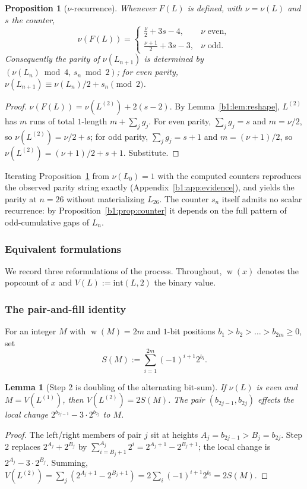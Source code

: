 \documentclass[a4paper]{article}
\theoremstyle{plain}
\newtheorem{proposition}{Proposition}[subsection]
\newtheorem{lemma}{Lemma}[subsection]
\theoremstyle{definition}
\theoremstyle{remark}
\DeclareMathOperator{\popcount}{w}
\begin{document}
\begin{proposition}[$\nu$-recurrence]\label{b1:prop:nu}
Whenever $F(L)$ is defined, with $\nu=\nu(L)$ and $s$ the counter,
\[ \nu(F(L))=\begin{cases}\tfrac{\nu}{2}+3s-4,& \nu\text{ even},\\ \tfrac{\nu+1}{2}+3s-3,& \nu\text{ odd}.\end{cases} \]
Consequently the parity of $\nu(L_{n+1})$ is determined by $(\nu(L_n)\bmod 4,\,s_n\bmod 2)$; for even parity, $\nu(L_{n+1})\equiv\nu(L_n)/2+s_n\pmod 2$.
\end{proposition}
\begin{proof}
$\nu(F(L))=\nu(L^{(2)})+2(s-2)$. By Lemma~\ref{b1:lem:reshape}, $L^{(2)}$ has $m$ runs of total $1$-length $m+\sum_j g_j$. For even parity, $\sum_j g_j=s$ and $m=\nu/2$, so $\nu(L^{(2)})=\nu/2+s$; for odd parity, $\sum_j g_j=s+1$ and $m=(\nu+1)/2$, so $\nu(L^{(2)})=(\nu+1)/2+s+1$. Substitute.
\end{proof}

Iterating Proposition~\ref{b1:prop:nu} from $\nu(L_0)=1$ with the computed counters reproduces the observed parity string exactly (Appendix~\ref{b1:app:evidence}), and yields the parity at $n=26$ without materializing $L_{26}$. The counter $s_n$ itself admits no scalar recurrence: by Proposition~\ref{b1:prop:counter} it depends on the full pattern of odd-cumulative gaps of $L_n$.

\subsubsection{Equivalent formulations}\label{b1:sec:equiv}
We record three reformulations of the process. Throughout, $\popcount(x)$ denotes the popcount of $x$ and $V(L):=\mathrm{int}(L,2)$ the binary value.

\subsubsection{The pair-and-fill identity}\label{b1:sec:10.1}
For an integer $M$ with $\popcount(M)=2m$ and $1$-bit positions $b_1>b_2>\dots>b_{2m}\ge 0$, set
\[ S(M):=\sum_{i=1}^{2m}(-1)^{i+1}2^{b_i}. \]

\begin{lemma}[Step 2 is doubling of the alternating bit-sum]\label{b1:lem:S}
If $\nu(L)$ is even and $M=V(L^{(1)})$, then $V(L^{(2)})=2S(M)$. The pair $(b_{2j-1},b_{2j})$ effects the local change $2^{b_{2j-1}}-3\cdot 2^{b_{2j}}$ to $M$.
\end{lemma}
\begin{proof}
The left/right members of pair $j$ sit at heights $A_j=b_{2j-1}>B_j=b_{2j}$. Step 2 replaces $2^{A_j}+2^{B_j}$ by $\sum_{i=B_j+1}^{A_j}2^i=2^{A_j+1}-2^{B_j+1}$; the local change is $2^{A_j}-3\cdot 2^{B_j}$. Summing, $V(L^{(2)})=\sum_j(2^{A_j+1}-2^{B_j+1})=2\sum_i(-1)^{i+1}2^{b_i}=2S(M)$.
\end{proof}
\end{document}
